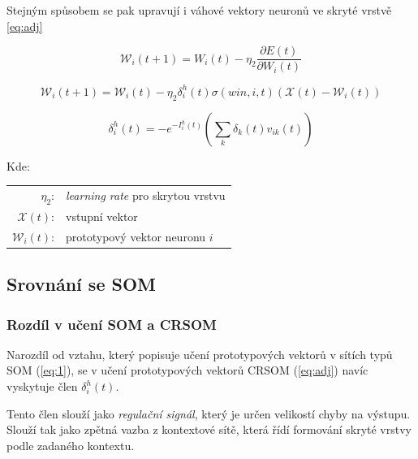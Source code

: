 \documentclass[thesis=M,czech]{FITthesis}[2012/06/26]
\begin{document}
    

Stejným spůsobem se pak upravují i váhové vektory neuronů ve skryté vrstvě \ref{eq:adj}
  
  \vspace{\baselineskip}
\noindent
  \begin{minipage}[c]{\textwidth }

\begin{equation*}
   \mathcal{W}_i(t+1)=W_i(t) -  \eta_2\frac{\partial{E(t)}}{\partial{W_i(t)}} 
\end{equation*}

\begin{equation}\label{eq:adj}
   \mathcal{W}_i(t+1)=\mathcal{W}_i(t) -  \eta_2\delta_i^h(t)\sigma(win, i, t)(\mathcal{X}(t) - \mathcal{W}_i(t))
\end{equation}

\begin{equation*}
   \delta_i^h(t)=-e^{-I_i^h(t)}(\sum\limits_k{\delta_k(t)v_{ik}(t)})
\end{equation*}



Kde:\\
\hspace*{3em}
\begin{tabular}{rl}
    $\eta_2$:& \textit{learning rate} pro skrytou vrstvu \\
        $\mathcal{X}(t)$:& vstupní vektor \\
            $\mathcal{W}_i(t)$:& prototypový vektor neuronu $i$ \\
\end{tabular}
\end{minipage} 
\vspace{\baselineskip}
\noindent
 

\subsection{Srovnání se SOM }
\subsubsection*{Rozdíl v učení SOM a CRSOM}
Narozdíl od vztahu, který popisuje učení prototypových vektorů v sítích typů SOM (\ref{eq:1}), se v učení prototypových vektorů CRSOM (\ref{eq:adj}) navíc vyskytuje člen $\delta_i^h(t)$.

Tento člen slouží jako \textit{regulační signál}, který je určen velikostí chyby na výstupu. Slouží tak jako zpětná vazba z kontextové sítě, která řídí formování skryté vrstvy podle zadaného kontextu.
\end{document}
